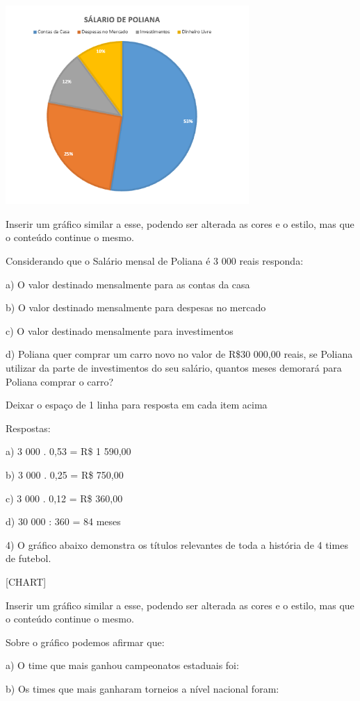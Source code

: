 \includegraphics[width=3.65in,height=2.98179in]{./imgSAEB_8_MAT/media/image41.png}

Inserir um gráfico similar a esse, podendo ser alterada as cores e o
estilo, mas que o conteúdo continue o mesmo.

Considerando que o Salário mensal de Poliana é 3 000 reais responda:

a) O valor destinado mensalmente para as contas da casa

b) O valor destinado mensalmente para despesas no mercado

c) O valor destinado mensalmente para investimentos

d) Poliana quer comprar um carro novo no valor de R\$30 000,00 reais, se
Poliana utilizar da parte de investimentos do seu salário, quantos meses
demorará para Poliana comprar o carro?

Deixar o espaço de 1 linha para resposta em cada item acima

Respostas:

a) 3 000 . 0,53 = R\$ 1 590,00

b) 3 000 . 0,25 = R\$ 750,00

c) 3 000 . 0,12 = R\$ 360,00

d) 30 000 : 360 = 84 meses

4) O gráfico abaixo demonstra os títulos relevantes de toda a história
de 4 times de futebol.

{{[}CHART{]}}

Inserir um gráfico similar a esse, podendo ser alterada as cores e o
estilo, mas que o conteúdo continue o mesmo.

Sobre o gráfico podemos afirmar que:

a) O time que mais ganhou campeonatos estaduais foi:

b) Os times que mais ganharam torneios a nível nacional foram:

